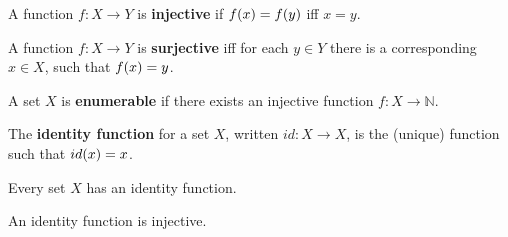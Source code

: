 \def\codomain#1{(co)\textsuperscript{$#1$}domain}








\begin{definition} A function $f:X\rightarrow Y$ is \textbf{injective} if
$f\mathopen{}\left({x}\right)\mathclose{}=f\mathopen{}\left({y}\right)\mathclose{}$ iff $x=y$. \end{definition}

\begin{definition} A function $f:X\rightarrow Y$ is \textbf{surjective} iff for
each $y\in Y$ there is a corresponding $x\in X$, such that $f\mathopen{}\left({x}\right)\mathclose{}=y$.
\end{definition}

\begin{definition} \label{def:enumerable} A set $X$ is \textbf{enumerable} if
there exists an injective function $f:X\rightarrow \mathbb{N}$.
\end{definition}

\begin{definition} The \textbf{identity function} for a set $X$, written
$id:X\rightarrow X$, is the (unique) function such that $id\mathopen{}\left({x}\right)\mathclose{}=x$.
\end{definition}

\begin{corollary} Every set $X$ has an identity function. \end{corollary}

\begin{corollary} An identity function is injective. \end{corollary}

